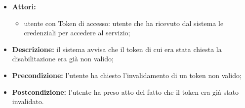 \begin{itemize}
	\item \textbf{Attori:}
	\begin{itemize}
		\item utente con Token di accesso: utente che ha ricevuto dal sistema le credenziali per accedere al servizio;
	\end{itemize}
	\item \textbf{Descrizione:} il sistema avvisa che il token di cui era stata chiesta la disabilitazione era già non valido;
	\item \textbf{Precondizione:} l'utente ha chiesto l'invalidamento di un token non valido;
	\item \textbf{Postcondizione:} l'utente ha preso atto del fatto che il token era già stato invalidato.
\end{itemize}


\pagebreak
